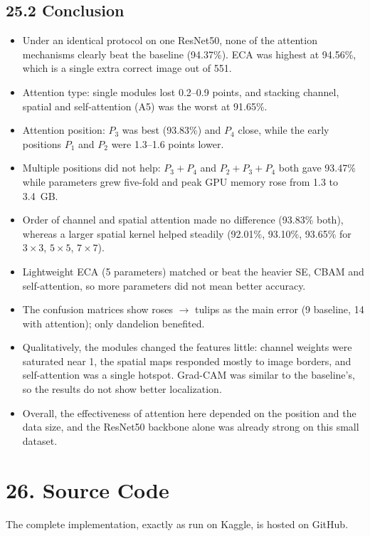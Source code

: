 \documentclass[11pt]{article}
\begin{document}
\subsection*{25.2 Conclusion}

\begin{itemize}
\item Under an identical protocol on one ResNet50, none of the attention
mechanisms clearly beat the baseline (94.37\%). ECA was highest at 94.56\%,
which is a single extra correct image out of 551.
\item Attention type: single modules lost 0.2--0.9 points, and stacking channel,
spatial and self-attention (A5) was the worst at 91.65\%.
\item Attention position: $P_3$ was best (93.83\%) and $P_4$ close, while the
early positions $P_1$ and $P_2$ were 1.3--1.6 points lower.
\item Multiple positions did not help: $P_3+P_4$ and $P_2+P_3+P_4$ both gave
93.47\% while parameters grew five-fold and peak GPU memory rose from 1.3 to
3.4~GB.
\item Order of channel and spatial attention made no difference (93.83\% both),
whereas a larger spatial kernel helped steadily (92.01\%, 93.10\%, 93.65\%
for $3\times3$, $5\times5$, $7\times7$).
\item Lightweight ECA (5 parameters) matched or beat the heavier SE, CBAM and
self-attention, so more parameters did not mean better accuracy.
\item The confusion matrices show roses $\rightarrow$ tulips as the main error
(9 baseline, 14 with attention); only dandelion benefited.
\item Qualitatively, the modules changed the features little: channel weights
were saturated near 1, the spatial maps responded mostly to image borders,
and self-attention was a single hotspot. Grad-CAM was similar to the
baseline's, so the results do not show better localization.
\item Overall, the effectiveness of attention here depended on the position
and the data size, and the ResNet50 backbone alone was already strong on this
small dataset.
\end{itemize}

\section*{26. Source Code}

The complete implementation, exactly as run on Kaggle, is hosted on GitHub.
\end{document}
